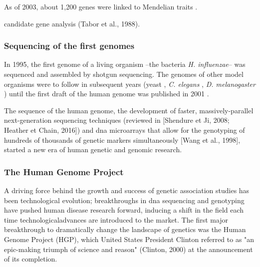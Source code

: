 As of 2003, about 1,200 genes were linked to Mendelian
traits \cite{botstein2003discovering}.



candidate gene analysis (Tabor et al., 1988). \cite{tabor2002candidate}

\subsubsection{Sequencing of the first genomes}
 

In 1995, the first genome of a living organism –the bacteria \textit{H. influenzae}– was sequenced and assembled by shotgun sequencing. 
The genomes of other model organisms were to follow in subsequent years (yeast \cite{goffeau1996life}, \textit{C. elegans} \cite{c1998genome}, \textit{D. melanogaster} \cite{adams2000genome}) until the first draft of the human genome was published in 2001 \cite{lander2001initial}.

The sequence of the human genome, the development of faster, massively-parallel next-generation sequencing techniques (reviewed in [Shendure et Ji, 2008; Heather et Chain, 2016]) and \gls{dna} microarrays that allow for the genotyping of hundreds of thousands of genetic markers simultaneously [Wang et al., 1998], started a new era of human genetic and genomic research.



\subsubsection{The Human Genome Project}

\cite{lander2001initial}

A driving force behind the growth and success of genetic association studies has been technological evolution; breakthroughs in \gls{dna} sequencing and genotyping have pushed human disease research forward, inducing a shift in the field each time technologicaladvances are introduced to the market. 
The first major breakthrough to dramatically change the landscape of genetics was the Human Genome Project (HGP), which United States President Clinton referred to as "an epic-making triumph of science and reason" (Clinton, 2000) at the announcement of its completion.\\

